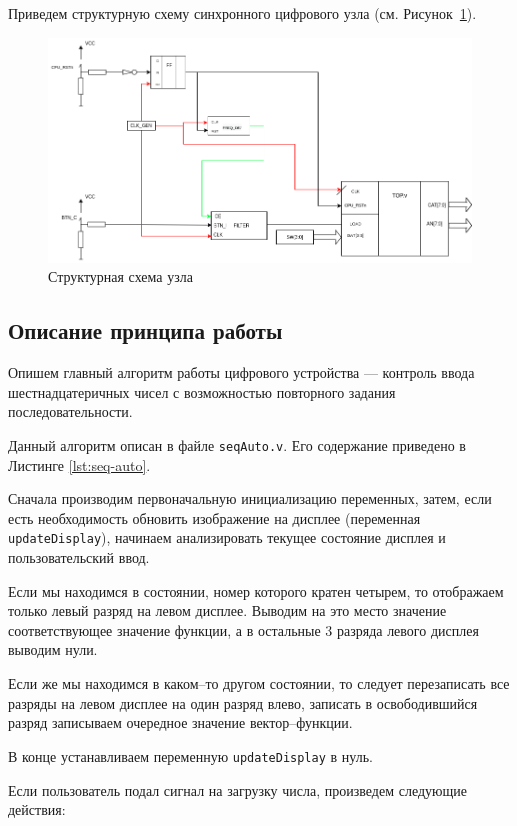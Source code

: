 \documentclass[a4paper,14pt]{extarticle}
\begin{document}
Приведем структурную схему синхронного цифрового узла (см. Рисунок~\ref{fig:unit-pract3}).

\begin{figure}[h!]
	\centering
	\includegraphics[width=0.8\linewidth]{images/unit-pract3}
	\caption{Структурная схема узла}
	\label{fig:unit-pract3}
\end{figure}


\subsection*{Описание принципа работы}

Опишем главный алгоритм работы цифрового устройства --- контроль ввода шестнадцатеричных чисел с возможностью повторного задания последовательности.

Данный алгоритм описан в файле \texttt{seqAuto.v}. Его содержание приведено в Листинге \ref{lst:seq-auto}.

Сначала производим первоначальную инициализацию переменных, затем, если есть необходимость обновить изображение на дисплее (переменная \texttt{updateDisplay}), начинаем анализировать текущее состояние дисплея и пользовательский ввод. 

Если мы находимся в состоянии, номер которого кратен четырем, то отображаем только левый разряд на левом дисплее. Выводим на это место значение соответствующее значение функции, а в остальные 3 разряда левого дисплея выводим нули.

Если же мы находимся в каком--то другом состоянии, то следует перезаписать все разряды на левом дисплее на один разряд влево, записать в освободившийся разряд записываем очередное значение вектор--функции. 

В конце устанавливаем переменную \texttt{updateDisplay} в нуль. 

Если пользователь подал сигнал на загрузку числа, произведем следующие действия:
\end{document}
